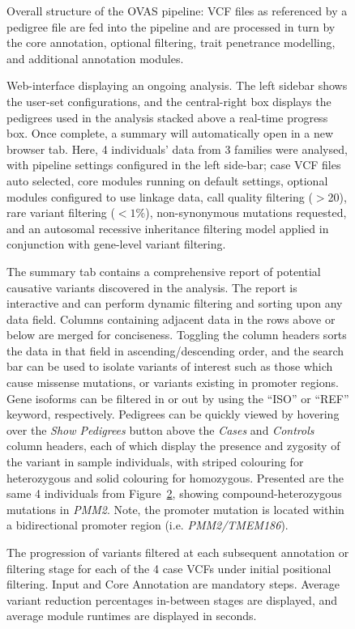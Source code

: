 \documentclass[twocolumn]{bmcart}%
\def\app{OVAS}
\begin{document}
\begin{backmatter}
%
\enlargethispage{3cm}
\begin{figure}[t]
\caption{\csentence{}Overall structure of the \app{} pipeline: VCF files as referenced by a pedigree file are fed into the pipeline and are processed in turn by the core annotation, optional filtering, trait penetrance modelling, and additional annotation modules. \label{fig1}}
\end{figure}
\begin{figure}[t]
\caption{\csentence{}Web-interface displaying an ongoing analysis. The left sidebar shows the user-set configurations, and the central-right box displays the pedigrees used in the analysis stacked above a real-time progress box. Once complete, a summary will automatically open in a new browser tab. Here, 4 individuals' data from 3 families were analysed, with pipeline settings configured in the left side-bar; case VCF files auto selected, core modules running on default settings, optional modules configured to use linkage data, call quality filtering ($>$20), rare variant filtering ($<1\%$), non-synonymous mutations requested, and an autosomal recessive inheritance filtering model applied in conjunction with gene-level variant filtering.\label{fig2}}
\end{figure}
\begin{figure}[t]
\caption{\csentence{}The summary tab contains a comprehensive report of potential causative variants discovered in the analysis. The report is interactive and can perform dynamic filtering and sorting upon any data field. Columns containing adjacent data in the rows above or below are merged for conciseness. Toggling the column headers sorts the data in that field in ascending/descending order, and the search bar can be used to isolate variants of interest such as those which cause missense mutations, or variants existing in promoter regions. Gene isoforms can be filtered in or out by using the ``ISO'' or ``REF'' keyword, respectively. Pedigrees can be quickly viewed by hovering over the \textit{Show Pedigrees} button above the \textit{Cases} and \textit{Controls} column headers, each of which display the presence and zygosity of the variant in sample individuals, with striped colouring for heterozygous and solid colouring for homozygous. Presented are the same 4 individuals from Figure~\ref{fig2}, showing compound-heterozygous mutations in \textit{PMM2}. Note, the promoter mutation is located within a bidirectional promoter region (i.e. \textit{PMM2/TMEM186}).\label{fig3}}
\end{figure}
\enlargethispage{3cm}
\begin{figure}[t]
\caption{\csentence{}The progression of variants filtered at each subsequent annotation or filtering stage for each of the 4 case VCFs under initial positional filtering. Input and Core Annotation are mandatory steps. Average variant reduction percentages in-between stages are displayed, and average module runtimes are displayed in seconds.\label{fig4}}
\end{figure}



\end{backmatter}
\end{document}
